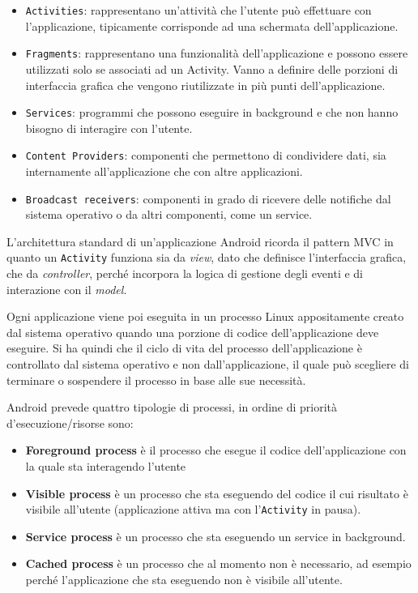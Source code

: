 \begin{itemize}
	\item \texttt{Activities}: rappresentano un'attività che l'utente può
		effettuare con l'applicazione, tipicamente corrisponde ad una
		schermata dell'applicazione.
	\item \texttt{Fragments}: rappresentano una funzionalità dell'applicazione e
		possono essere utilizzati solo se associati ad un Activity. Vanno a
		definire delle porzioni di interfaccia grafica che vengono
		riutilizzate in più punti dell'applicazione.
	\item \texttt{Services}: programmi che possono eseguire in background e che
		non hanno bisogno di interagire con l'utente.
	\item \texttt{Content Providers}: componenti che permettono di condividere
		dati, sia internamente all'applicazione che con altre applicazioni.
	\item \texttt{Broadcast receivers}: componenti in grado di ricevere delle
		notifiche dal sistema operativo o da altri componenti, come un
		service.
\end{itemize}

L'architettura standard di un'applicazione Android ricorda il pattern
MVC in quanto un \texttt{Activity} funziona sia da \textit{view}, dato che definisce
l'interfaccia grafica, che da \textit{controller}, perché incorpora la logica
di gestione degli eventi e di interazione con il \textit{model}.

Ogni applicazione viene poi eseguita in un processo Linux appositamente
creato dal sistema operativo quando una porzione di codice
dell'applicazione deve eseguire.
Si ha quindi che il ciclo di vita del processo dell'applicazione è
controllato dal sistema operativo e non dall'applicazione, il quale può
scegliere di terminare o sospendere il processo in base alle sue
necessità.

Android prevede quattro tipologie di processi, in ordine di priorità
d'esecuzione/risorse sono:

\begin{itemize}
	\item \textbf{Foreground process} è il processo che esegue il codice
		dell'applicazione con la quale sta interagendo l'utente
	\item \textbf{Visible process} è un processo che sta eseguendo del codice il
		cui risultato è visibile all'utente (applicazione attiva ma con
		l'\texttt{Activity} in pausa).
	\item \textbf{Service process} è un processo che sta eseguendo un service in
		background.
	\item \textbf{Cached process} è un processo che al momento non è necessario,
		ad esempio perché l'applicazione che sta eseguendo non è visibile
		all'utente.
\end{itemize}

